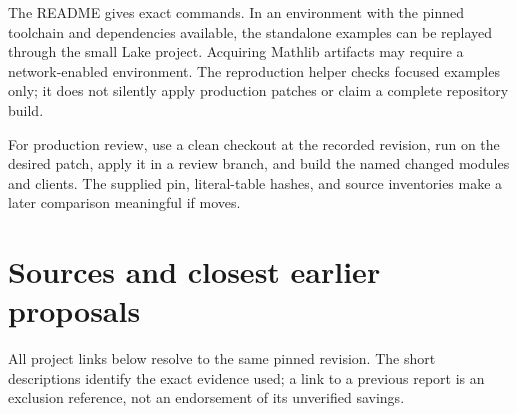 \documentclass[10pt,a4paper]{article}
\newcommand{\code}[1]{\texttt{\detokenize{#1}}}
\begin{document}
The README gives exact commands. In an environment with the pinned toolchain and dependencies available, the standalone examples can be replayed through the small Lake project. Acquiring Mathlib artifacts may require a network-enabled environment. The reproduction helper checks focused examples only; it does not silently apply production patches or claim a complete repository build.

For production review, use a clean checkout at the recorded revision, run \code{git apply --check} on the desired patch, apply it in a review branch, and build the named changed modules and clients. The supplied pin, literal-table hashes, and source inventories make a later comparison meaningful if \code{main} moves.

\clearpage
\section{Sources and closest earlier proposals}

All project links below resolve to the same pinned revision. The short descriptions identify the exact evidence used; a link to a previous report is an exclusion reference, not an endorsement of its unverified savings.
\end{document}
